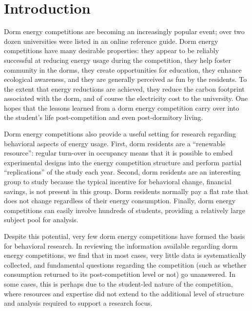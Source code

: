 
\section{Introduction}
\label{sec:intro}

Dorm energy competitions are becoming an increasingly popular event; over
two dozen universities were listed in an online reference guide.  Dorm
energy competitions have many desirable properties: they appear to be
reliably successful at reducing energy usage during the competition, they
help foster community in the dorms, they create opportunities for
education, they enhance ecological awareness, and they are generally
perceived as fun by the residents.  To the extent that energy reductions
are achieved, they reduce the carbon footprint associated with the dorm,
and of course the electricity cost to the university. One hopes that the
lessons learned from a dorm energy competition carry over into the
student's life post-competition and even post-dormitory living.

Dorm energy competitions also provide a useful setting for research
regarding behavioral aspects of energy usage.  First, dorm residents are a
``renewable resource'': regular turn-over in occupancy means that it is
possible to embed experimental designs into the energy competition
structure and perform partial ``replications'' of the study each year.
Second, dorm residents are an interesting group to study because the
typical incentive for behavioral change, financial savings, is not present
in this group. Dorm residents normally pay a flat rate that does not change
regardless of their energy consumption.  Finally, dorm energy competitions
can easily involve hundreds of students, providing a relatively large
subject pool for analysis.

Despite this potential, very few dorm energy competitions have formed the
basis for behavioral research.  In reviewing the information available
regarding dorm energy competitions, we find that in most cases, very little
data is systematically collected, and fundamental questions regarding the
competition (such as whether consumption returned to its post-competition
level or not) go unanswered.  In some cases, this is perhaps due to the
student-led nature of the competition, where resources and expertise did
not extend to the additional level of structure and analysis required to
support a research focus.

